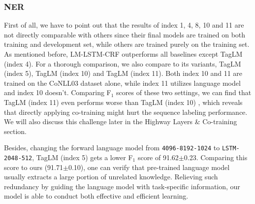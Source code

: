 \documentclass[letterpaper]{article} \usepackage{aaai18}  \usepackage{times}  \usepackage{helvet}  \usepackage{courier}  \usepackage{url}  \usepackage{graphicx}  \usepackage{multirow}
\newcommand{\our}{\textsc{LM-LSTM-CRF}\xspace}
\begin{document}
    \subsubsection{NER}
    First of all, we have to point out that the results of index 1, 4, 8, 10 and 11 are not directly comparable with others since their final models are trained on both training and development set, while others are trained purely on the training set. 
    As mentioned before, \our outperforms all baselines except TagLM (index 4).
    For a thorough comparison, we also compare to its variants, TagLM (index 5), TagLM (index 10) and TagLM (index 11).
    Both index 10 and 11 are trained on the CoNLL03 dataset alone, while index 11 utilizes language model and index 10 doesn't.
    Comparing F$_1$ scores of these two settings, we can find that TagLM (index 11) even performs worse than TagLM (index 10) , which reveals that directly applying co-training might hurt the sequence labeling performance.
    We will also discuss this challenge later in the Highway Layers \& Co-training section.

    Besides, changing the forward language model from \texttt{4096-8192-1024} to \texttt{LSTM-2048-512}, TagLM (index 5) gets a lower F$_1$ score of 91.62$\pm$0.23.
    Comparing this score to ours (91.71$\pm$0.10), one can verify that pre-trained language model usually extracts a large portion of unrelated knowledge.
    Relieving such redundancy by guiding the language model with task-specific information, our model is able to conduct both effective and efficient learning.
\end{document}
